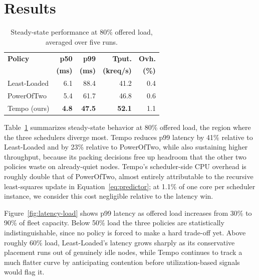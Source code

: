 \section{Results}
\label{sec:results}

\begin{table}[t]
\centering
\small
\caption{Steady-state performance at 80\% offered load, averaged over five runs.}
\label{tab:results}
\begin{tabular}{lrrrr}
\toprule
\textbf{Policy} & \textbf{p50} & \textbf{p99} & \textbf{Tput.} & \textbf{Ovh.} \\
 & \textbf{(ms)} & \textbf{(ms)} & \textbf{(kreq/s)} & \textbf{(\%)} \\
\midrule
Least-Loaded    & 6.1  & 88.4 & 41.2 & 0.4 \\
PowerOfTwo      & 5.4  & 61.7 & 46.8 & 0.6 \\
Tempo (ours)    & \textbf{4.8} & \textbf{47.5} & \textbf{52.1} & 1.1 \\
\bottomrule
\end{tabular}
\end{table}

Table~\ref{tab:results} summarizes steady-state behavior at 80\% offered
load, the region where the three schedulers diverge most. Tempo reduces
p99 latency by 41\% relative to Least-Loaded and by 23\% relative to
PowerOfTwo, while also sustaining higher throughput, because its packing
decisions free up headroom that the other two policies waste on
already-quiet nodes. Tempo's scheduler-side CPU overhead is roughly double
that of PowerOfTwo, almost entirely attributable to the recursive
least-squares update in Equation~\ref{eq:predictor}; at 1.1\% of one core
per scheduler instance, we consider this cost negligible relative to the
latency win.

Figure~\ref{fig:latency-load} shows p99 latency as offered load increases
from 30\% to 90\% of fleet capacity. Below 50\% load the three policies are
statistically indistinguishable, since no policy is forced to make a hard
trade-off yet. Above roughly 60\% load, Least-Loaded's latency grows
sharply as its conservative placement runs out of genuinely idle nodes,
while Tempo continues to track a much flatter curve by anticipating
contention before utilization-based signals would flag it.

